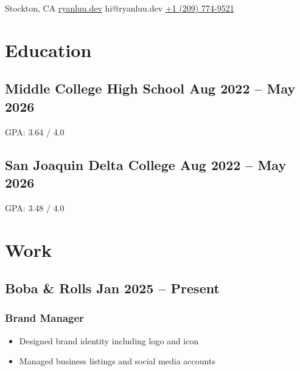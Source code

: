 \documentclass{my_cv}
\begin{document}

\begin{center}
    Stockton, CA {\large\textperiodcentered} 
    \href{https://ryanluu.dev/}{ryanluu.dev} {\large\textperiodcentered} 
    hi@ryanluu.dev {\large\textperiodcentered} 
    \href{tel:12097749521}{+1 (209) 774-9521}
\end{center}

\section{Education}

\subsection{Middle College High School \hfill Aug 2022 -- May 2026}
GPA: 3.64 / 4.0

\subsection{San Joaquin Delta College \hfill Aug 2022 -- May 2026}
GPA: 3.48 / 4.0

\section{Work}

\subsection{Boba \& Rolls \hfill Jan 2025 -- Present}
\subsubsection{Brand \hfill Manager}
\begin{itemize}
    \item Designed brand identity including logo and icon
    \item Managed business listings and social media accounts
\end{itemize}

\end{document}
